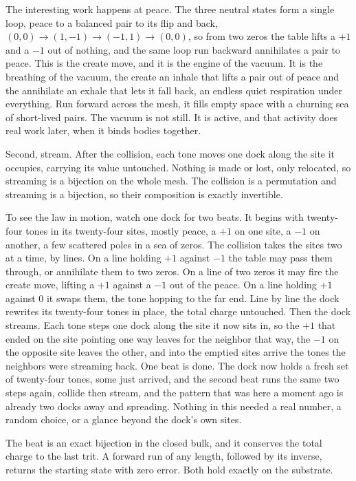 The interesting work happens at peace. The three neutral states form a single loop, peace to a balanced pair to its flip and back, $(0,0) \to (1,-1) \to (-1,1) \to (0,0)$, so from two zeros the table lifts a $+1$ and a $-1$ out of nothing, and the same loop run backward annihilates a pair to peace. This is the create move, and it is the engine of the vacuum. It is the breathing of the vacuum, the create an inhale that lifts a pair out of peace and the annihilate an exhale that lets it fall back, an endless quiet respiration under everything. Run forward across the mesh, it fills empty space with a churning sea of short-lived pairs. The vacuum is not still. It is active, and that activity does real work later, when it binds bodies together.

Second, stream. After the collision, each tone moves one dock along the site it occupies, carrying its value untouched. Nothing is made or lost, only relocated, so streaming is a bijection on the whole mesh. The collision is a permutation and streaming is a bijection, so their composition is exactly invertible.

To see the law in motion, watch one dock for two beats. It begins with twenty-four tones in its twenty-four sites, mostly peace, a $+1$ on one site, a $-1$ on another, a few scattered poles in a sea of zeros. The collision takes the sites two at a time, by lines. On a line holding $+1$ against $-1$ the table may pass them through, or annihilate them to two zeros. On a line of two zeros it may fire the create move, lifting a $+1$ against a $-1$ out of the peace. On a line holding $+1$ against $0$ it swaps them, the tone hopping to the far end. Line by line the dock rewrites its twenty-four tones in place, the total charge untouched. Then the dock streams. Each tone steps one dock along the site it now sits in, so the $+1$ that ended on the site pointing one way leaves for the neighbor that way, the $-1$ on the opposite site leaves the other, and into the emptied sites arrive the tones the neighbors were streaming back. One beat is done. The dock now holds a fresh set of twenty-four tones, some just arrived, and the second beat runs the same two steps again, collide then stream, and the pattern that was here a moment ago is already two docks away and spreading. Nothing in this needed a real number, a random choice, or a glance beyond the dock's own sites.

\begin{result}
The beat is an exact bijection in the closed bulk, and it conserves the total charge to the last trit. A forward run of any length, followed by its inverse, returns the starting state with zero error. Both hold exactly on the substrate. \cite{pollard2026vibetest}
\end{result}


